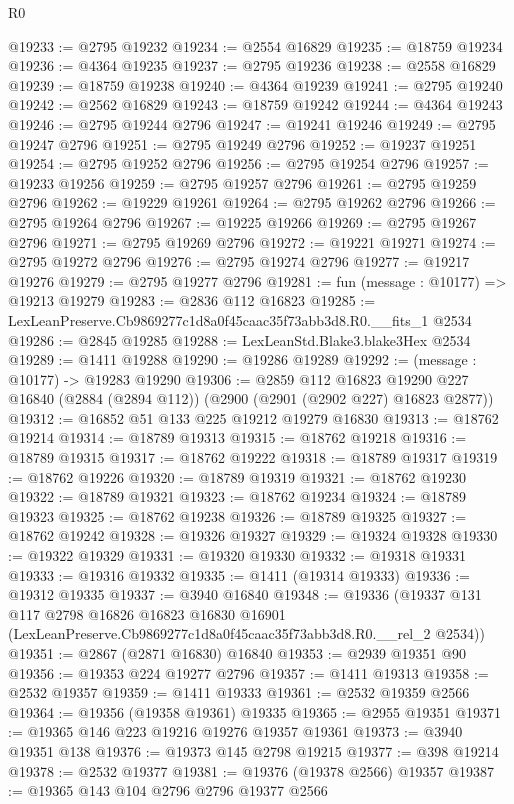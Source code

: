 \begin{lexlean}{R0}
\begin{coremodule}
@19233 := @2795 @19232
@19234 := @2554 @16829
@19235 := @18759 @19234
@19236 := @4364 @19235
@19237 := @2795 @19236
@19238 := @2558 @16829
@19239 := @18759 @19238
@19240 := @4364 @19239
@19241 := @2795 @19240
@19242 := @2562 @16829
@19243 := @18759 @19242
@19244 := @4364 @19243
@19246 := @2795 @19244 @2796
@19247 := @19241 @19246
@19249 := @2795 @19247 @2796
@19251 := @2795 @19249 @2796
@19252 := @19237 @19251
@19254 := @2795 @19252 @2796
@19256 := @2795 @19254 @2796
@19257 := @19233 @19256
@19259 := @2795 @19257 @2796
@19261 := @2795 @19259 @2796
@19262 := @19229 @19261
@19264 := @2795 @19262 @2796
@19266 := @2795 @19264 @2796
@19267 := @19225 @19266
@19269 := @2795 @19267 @2796
@19271 := @2795 @19269 @2796
@19272 := @19221 @19271
@19274 := @2795 @19272 @2796
@19276 := @2795 @19274 @2796
@19277 := @19217 @19276
@19279 := @2795 @19277 @2796
@19281 := fun (message : @10177) => @19213 @19279
@19283 := @2836 @112 @16823
@19285 := LexLeanPreserve.Cb9869277c1d8a0f45caac35f73abb3d8.R0.__fits_1 @2534
@19286 := @2845 @19285
@19288 := LexLeanStd.Blake3.blake3Hex @2534
@19289 := @1411 @19288
@19290 := @19286 @19289
@19292 := (message : @10177) -> @19283 @19290
@19306 := @2859
    @112
    @16823
    @19290
    @227
    @16840
    (@2884 (@2894 @112))
    (@2900 (@2901 (@2902 @227) @16823 @2877))
@19312 := @16852 @51 @133 @225 @19212 @19279 @16830
@19313 := @18762 @19214
@19314 := @18789 @19313
@19315 := @18762 @19218
@19316 := @18789 @19315
@19317 := @18762 @19222
@19318 := @18789 @19317
@19319 := @18762 @19226
@19320 := @18789 @19319
@19321 := @18762 @19230
@19322 := @18789 @19321
@19323 := @18762 @19234
@19324 := @18789 @19323
@19325 := @18762 @19238
@19326 := @18789 @19325
@19327 := @18762 @19242
@19328 := @19326 @19327
@19329 := @19324 @19328
@19330 := @19322 @19329
@19331 := @19320 @19330
@19332 := @19318 @19331
@19333 := @19316 @19332
@19335 := @1411 (@19314 @19333)
@19336 := @19312 @19335
@19337 := @3940 @16840
@19348 := @19336
    (@19337
      @131
      @117
      @2798
      @16826
      @16823
      @16830
      @16901
      (LexLeanPreserve.Cb9869277c1d8a0f45caac35f73abb3d8.R0.__rel_2 @2534))
@19351 := @2867 (@2871 @16830) @16840
@19353 := @2939 @19351 @90
@19356 := @19353 @224 @19277 @2796
@19357 := @1411 @19313
@19358 := @2532 @19357
@19359 := @1411 @19333
@19361 := @2532 @19359 @2566
@19364 := @19356 (@19358 @19361) @19335
@19365 := @2955 @19351
@19371 := @19365 @146 @223 @19216 @19276 @19357 @19361
@19373 := @3940 @19351 @138
@19376 := @19373 @145 @2798 @19215
@19377 := @398 @19214
@19378 := @2532 @19377
@19381 := @19376 (@19378 @2566) @19357
@19387 := @19365 @143 @104 @2796 @2796 @19377 @2566

\end{coremodule}
\end{lexlean}
